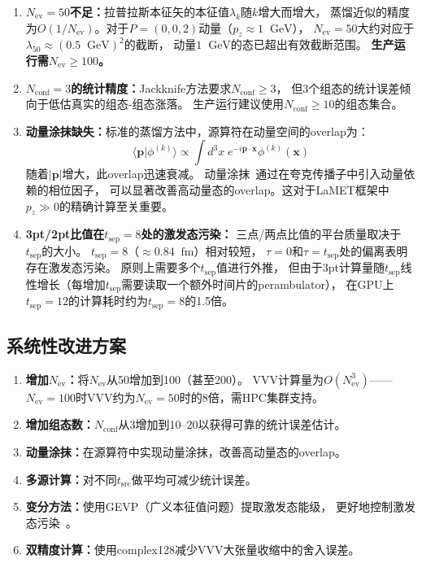 \documentclass[11pt,a4paper]{article}
\newcommand{\gev}{\;\mathrm{GeV}}
\newcommand{\fm}{\;\mathrm{fm}}
\newcommand{\Nconf}{N_{\mathrm{conf}}}
\newcommand{\Nev}{N_{\mathrm{ev}}}
\newcommand{\tsep}{t_{\mathrm{sep}}}
\newcommand{\tsrc}{t_{\mathrm{src}}}
\begin{document}
\begin{enumerate}[leftmargin=*]
\item \textbf{$\Nev=50$不足：}拉普拉斯本征矢的本征值$\lambda_k$随$k$增大而增大，
蒸馏近似的精度为$O(1/\Nev)$。对于$P=(0,0,2)$动量（$p_z\approx 1\;\gev$），
$\Nev=50$大约对应于$\lambda_{50}\approx (0.5\;\gev)^2$的截断，
动量$1\;\gev$的态已超出有效截断范围。
\textbf{生产运行需$\Nev\geq 100$。}

\item \textbf{$\Nconf=3$的统计精度：}Jackknife方法要求$N_{\mathrm{conf}}\geq 3$，
但3个组态的统计误差倾向于低估真实的组态-组态涨落。
生产运行建议使用$\Nconf\geq 10$的组态集合。

\item \textbf{动量涂抹缺失：}标准的蒸馏方法中，源算符在动量空间的overlap为：
\begin{equation}
\langle \bm{p} | \phi^{(k)} \rangle \propto
\int d^3x\; e^{-i\bm{p}\cdot\bm{x}} \phi^{(k)}(\bm{x})
\end{equation}
随着$|\bm{p}|$增大，此overlap迅速衰减。
动量涂抹~\cite{bali2016}通过在夸克传播子中引入动量依赖的相位因子，
可以显著改善高动量态的overlap。这对于LaMET框架中$p_z\gg 0$的精确计算至关重要。

\item \textbf{3pt/2pt比值在$\tsep=8$处的激发态污染：}
三点/两点比值的平台质量取决于$\tsep$的大小。
$\tsep=8$（$\approx 0.84\;\fm$）相对较短，
$\tau=0$和$\tau=\tsep$处的偏离表明存在激发态污染。
原则上需要多个$\tsep$值进行外推，
但由于3pt计算量随$\tsep$线性增长（每增加$\tsep$需要读取一个额外时间片的perambulator），
在GPU上$\tsep=12$的计算耗时约为$\tsep=8$的1.5倍。
\end{enumerate}

\subsection{系统性改进方案}

\begin{enumerate}[leftmargin=*]
\item \textbf{增加$\Nev$：}将$\Nev$从50增加到100（甚至200）。
VVV计算量为$O(\Nev^3)$——$\Nev=100$时VVV约为$\Nev=50$时的8倍，需HPC集群支持。
\item \textbf{增加组态数：}$\Nconf$从3增加到10--20以获得可靠的统计误差估计。
\item \textbf{动量涂抹：}在源算符中实现动量涂抹，改善高动量态的overlap。
\item \textbf{多源计算：}对不同$\tsrc$做平均可减少统计误差。
\item \textbf{变分方法：}使用GEVP（广义本征值问题）提取激发态能级，
更好地控制激发态污染~\cite{blossier2009}。
\item \textbf{双精度计算：}使用complex128减少VVV大张量收缩中的舍入误差。
\end{enumerate}
\end{document}
